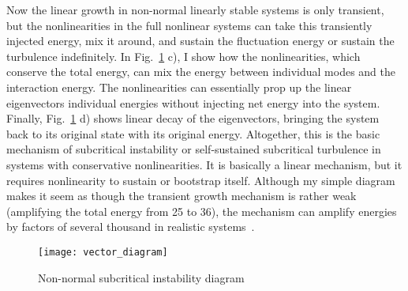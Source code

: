 Now the linear growth in non-normal linearly stable systems is only transient, but the nonlinearities in the full nonlinear systems can take this transiently injected energy, mix it around,
and sustain the fluctuation energy or sustain the turbulence indefinitely. In Fig.~\ref{vector_diagram} c), I show how the nonlinearities, which conserve the total energy, can mix the energy
between individual modes and the interaction energy. The nonlinearities can essentially prop up the linear eigenvectors individual energies without injecting net energy into the system.
Finally, Fig.~\ref{vector_diagram} d) shows linear decay of the eigenvectors, bringing the system back to its original state with its original energy. Altogether, this is the basic
mechanism of subcritical instability or self-sustained subcritical turbulence in systems with conservative nonlinearities. It is basically a linear mechanism, but it requires nonlinearity to
sustain or bootstrap itself.
Although my simple diagram makes it seem as though the transient growth mechanism is rather weak
(amplifying the total energy from 25 to 36), the mechanism can amplify energies by factors of several thousand in realistic systems~\cite{gustavsson1991,butler1992}.

\begin{figure}[!ht]
\centerline{\texttt{[image: vector\_diagram]}}
\caption{Non-normal subcritical instability diagram}
\label{vector_diagram}
\end{figure}
